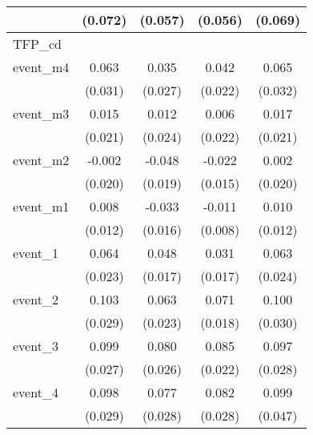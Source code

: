 \begin{table}[htbp]
\begin{tabular}{l*{4}{c}}
            &     (0.072)         &     (0.057)         &     (0.056)         &     (0.069)         \\
\hline
TFP\_cd      &                     &                     &                     &                     \\
event\_m4    &       0.063\sym{*}  &       0.035         &       0.042         &       0.065\sym{*}  \\
            &     (0.031)         &     (0.027)         &     (0.022)         &     (0.032)         \\
[1em]
event\_m3    &       0.015         &       0.012         &       0.006         &       0.017         \\
            &     (0.021)         &     (0.024)         &     (0.022)         &     (0.021)         \\
[1em]
event\_m2    &      -0.002         &      -0.048\sym{*}  &      -0.022         &       0.002         \\
            &     (0.020)         &     (0.019)         &     (0.015)         &     (0.020)         \\
[1em]
event\_m1    &       0.008         &      -0.033\sym{*}  &      -0.011         &       0.010         \\
            &     (0.012)         &     (0.016)         &     (0.008)         &     (0.012)         \\
[1em]
event\_1     &       0.064\sym{**} &       0.048\sym{**} &       0.031         &       0.063\sym{**} \\
            &     (0.023)         &     (0.017)         &     (0.017)         &     (0.024)         \\
[1em]
event\_2     &       0.103\sym{***}&       0.063\sym{**} &       0.071\sym{***}&       0.100\sym{***}\\
            &     (0.029)         &     (0.023)         &     (0.018)         &     (0.030)         \\
[1em]
event\_3     &       0.099\sym{***}&       0.080\sym{**} &       0.085\sym{***}&       0.097\sym{***}\\
            &     (0.027)         &     (0.026)         &     (0.022)         &     (0.028)         \\
[1em]
event\_4     &       0.098\sym{***}&       0.077\sym{**} &       0.082\sym{**} &       0.099\sym{*}  \\
            &     (0.029)         &     (0.028)         &     (0.028)         &     (0.047)         \\

\end{tabular}
\end{table}
